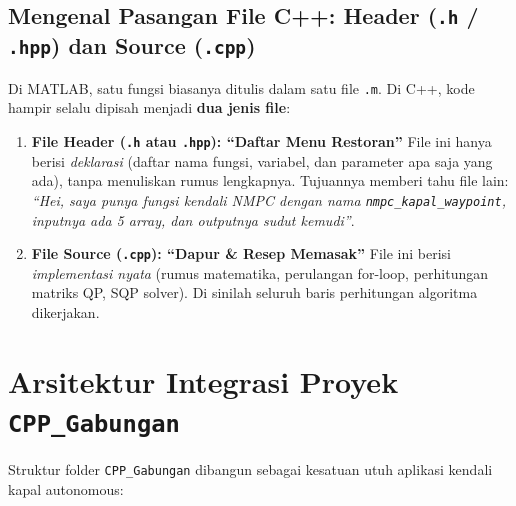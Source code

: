 \documentclass[11pt,a4paper]{article}
\begin{document}
\subsection{Mengenal Pasangan File C++: Header (\texttt{.h} / \texttt{.hpp}) dan Source (\texttt{.cpp})}

Di MATLAB, satu fungsi biasanya ditulis dalam satu file \texttt{.m}. Di C++, kode hampir selalu dipisah menjadi \textbf{dua jenis file}:

\begin{enumerate}[leftmargin=*]
    \item \textbf{File Header (\texttt{.h} atau \texttt{.hpp}): ``Daftar Menu Restoran''}
    File ini hanya berisi \textit{deklarasi} (daftar nama fungsi, variabel, dan parameter apa saja yang ada), tanpa menuliskan rumus lengkapnya. Tujuannya memberi tahu file lain: \textit{``Hei, saya punya fungsi kendali NMPC dengan nama \texttt{nmpc\_kapal\_waypoint}, inputnya ada 5 array, dan outputnya sudut kemudi''}.
    
    \item \textbf{File Source (\texttt{.cpp}): ``Dapur \& Resep Memasak''}
    File ini berisi \textit{implementasi nyata} (rumus matematika, perulangan for-loop, perhitungan matriks QP, SQP solver). Di sinilah seluruh baris perhitungan algoritma dikerjakan.
\end{enumerate}

\section{Arsitektur Integrasi Proyek \texttt{CPP\_Gabungan}}

Struktur folder \texttt{CPP\_Gabungan} dibangun sebagai kesatuan utuh aplikasi kendali kapal autonomous:
\end{document}
